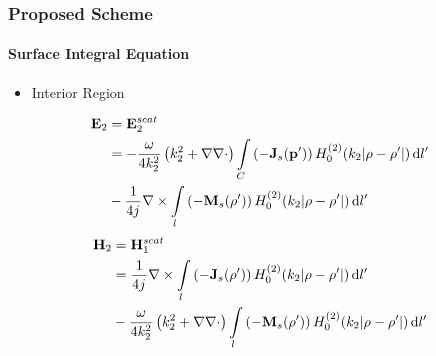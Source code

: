 \documentclass[mathserif,16pt,xcolor=table]{beamer}
\begin{document}
\begin{frame}
  \frametitle{Proposed Scheme}
  \framesubtitle{Surface Integral Equation}
  \vspace*{-.4cm}
  \begin{itemize}
    \item{Interior Region}
  \end{itemize}
  \begin{equation} \nonumber
    \begin{split}
      \mathbf{E}_2 &= \mathbf{E}_2^{scat} \\
      &=  -\frac{\omega}{4 k_2^2} \left( k_2^2 + \nabla \nabla \cdot \right) \int\limits_{C} \left(-\mathbf{J}_s(\mathbf{p}')\right) H_0^{(2)}(k_2 |\mathbf{\rho} - \mathbf{\rho}'|) \mathop{}\!\mathrm{d}{l'} \\
      &- \frac{1}{4 {j}\mkern1mu} \nabla \times \int\limits_{l} \left(-\mathbf{M}_s(\mathbf{\rho}')\right) H_0^{(2)}(k_2 |\mathbf{\rho} - \mathbf{\rho}'|) \mathop{}\!\mathrm{d}{l'}
    \end{split}
    \label{eq:E1sc}
  \end{equation}
  \begin{equation} \nonumber
    \begin{split}
      \mathbf{H}_2 &= \mathbf{H}_1^{scat} \\
      &= \frac{1}{4 {j}\mkern1mu} \nabla \times \int\limits_{l} \left(-\mathbf{J}_s(\mathbf{\rho}')\right) H_0^{(2)}(k_2 |\mathbf{\rho} - \mathbf{\rho}'|) \mathop{}\!\mathrm{d}{l'} \\
      &-\frac{\omega}{4 k_2^2} \left( k_2^2 + \nabla \nabla \cdot \right) \int\limits_{l} \left(-\mathbf{M}_s(\mathbf{\rho}')\right) H_0^{(2)}(k_2 |\mathbf{\rho} - \mathbf{\rho}'|) \mathop{}\!\mathrm{d}{l'}
    \end{split}
    \label{eq:H1sc}
  \end{equation}
\end{frame}
\end{document}

